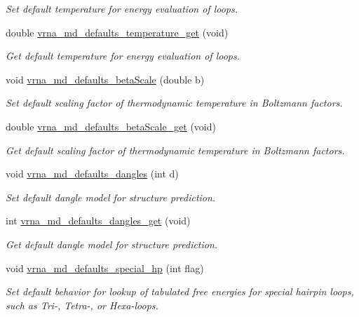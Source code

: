 \begin{DoxyCompactItemize}
\begin{DoxyCompactList}\small\item\em Set default temperature for energy evaluation of loops. \end{DoxyCompactList}\item 
double \hyperlink{group__model__details_ga96b24a74437f9ba46c4e06343155bf46}{vrna\+\_\+md\+\_\+defaults\+\_\+temperature\+\_\+get} (void)
\begin{DoxyCompactList}\small\item\em Get default temperature for energy evaluation of loops. \end{DoxyCompactList}\item 
void \hyperlink{group__model__details_gae984567db36c3f9b8731ecc917abf3a2}{vrna\+\_\+md\+\_\+defaults\+\_\+beta\+Scale} (double b)
\begin{DoxyCompactList}\small\item\em Set default scaling factor of thermodynamic temperature in Boltzmann factors. \end{DoxyCompactList}\item 
double \hyperlink{group__model__details_gabb8780f5410c52f970d75b044059bd09}{vrna\+\_\+md\+\_\+defaults\+\_\+beta\+Scale\+\_\+get} (void)
\begin{DoxyCompactList}\small\item\em Get default scaling factor of thermodynamic temperature in Boltzmann factors. \end{DoxyCompactList}\item 
void \hyperlink{group__model__details_gac76a5374def8e5e4e644ff6e4cc72dee}{vrna\+\_\+md\+\_\+defaults\+\_\+dangles} (int d)
\begin{DoxyCompactList}\small\item\em Set default dangle model for structure prediction. \end{DoxyCompactList}\item 
int \hyperlink{group__model__details_ga67ca06f95ae133778c79a4493c9817b8}{vrna\+\_\+md\+\_\+defaults\+\_\+dangles\+\_\+get} (void)
\begin{DoxyCompactList}\small\item\em Get default dangle model for structure prediction. \end{DoxyCompactList}\item 
void \hyperlink{group__model__details_gafff6449a02744add0308e653230c15fc}{vrna\+\_\+md\+\_\+defaults\+\_\+special\+\_\+hp} (int flag)
\begin{DoxyCompactList}\small\item\em Set default behavior for lookup of tabulated free energies for special hairpin loops, such as Tri-\/, Tetra-\/, or Hexa-\/loops. \end{DoxyCompactList}\item 

\end{DoxyCompactItemize}
